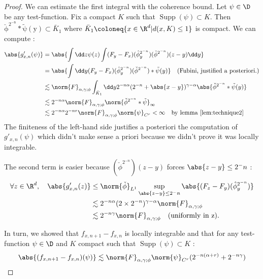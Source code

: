 \begin{proof}
We can estimate the first integral with the coherence bound.
Let $\psi \in \D$ be any test-function. Fix a compact $K$ such that $\operatorname{Supp}(\psi)\subset K$.
Then $\operatorname{\check{\phi}^{2^{-n}}*\tilde{\psi}(y)} \subset \bar{K}_1$ where $\bar{K}_1 \coloneq \{x \in \R^d \vert d(x,K)\leq 1\}$ is compact.
We can compute :
\begin{align*}
    \abs{g'_{x,n}(\psi)} & = \abs{\int \dd z \psi(z) \int (F_y - F_x)(\hat{\phi}^{2^{-n}}_y) (\check{\phi}^{2^{-n}})(z-y) \dd y} \\
    & = \abs{\int \dd y (F_y - F_x)(\hat{\phi}^{2^{-n}}_y) (\check{\phi}^{2^{-n}})*\tilde{\psi}(y)} \quad (\text{Fubini, justified a posteriori.}) \\
    & \lesssim \norm{F}_{\alpha, \gamma ; \phi} \int_{\bar{K}_1} \dd y 2^{-n\alpha}(2^{-n}+ \abs{x - y})^{\gamma - \alpha} \abs{\check{\phi}^{2^{-n}}*\tilde{\psi}(y)} \\
    &\lesssim 2^{-n\alpha}\norm{F}_{\alpha, \gamma ; \phi} \norm{\check{\phi}^{2^{-n}}*\tilde{\psi}}_\infty \\
    &\lesssim 2^{-n\alpha} 2^{-nr}\norm{F}_{\alpha, \gamma ; \phi}\norm{\psi}_{C^r} < \infty  \quad \text{by lemma \ref{lem:technique2}} \\
\end{align*}
The finiteness of the left-hand side justifies a posteriori the computation of $g'_{x,n}(\psi)$ which didn't make sense a priori because we didn't prove it was locally integrable.

The second term is easier because $(\check{\phi}^{2^{-n}})(z-y)$ forces $\abs{z-y}\leq 2^-n$ : 
\begin{align*}
    \forall z \in \R^d, \quad \abs{g'_{x,n}(z)} &\leq \norm{\check{\phi}}_{L^1} \sup_{\abs{z-y}\leq 2^-n} \abs{(F_z - F_y)(\hat{\phi}^{2^{-n}}_y)} \\
    &\lesssim 2^{-n\alpha}(2\times2^{-n})^{\gamma - \alpha}\norm{F}_{\alpha, \gamma ; \phi} \\
    &\lesssim 2^{-n \gamma}\norm{F}_{\alpha, \gamma ; \phi} \quad (\text{uniformly in z}).
\end{align*}

In turn, we showed that $f_{x,n+1} - f_{x,n}$ is locally integrable and that for any test-function $\psi\in \D$ and $K$ compact such that $\operatorname{Supp}(\psi)\subset K$ :
\begin{equation*}
    \abs{(f_{x,n+1} - f_{x,n})(\psi)} \lesssim \norm{F}_{\alpha, \gamma ; \phi}\norm{\psi}_{C^r} (2^{-n (\alpha +r)} + 2^{-n \gamma})
\end{equation*}


\end{proof}
